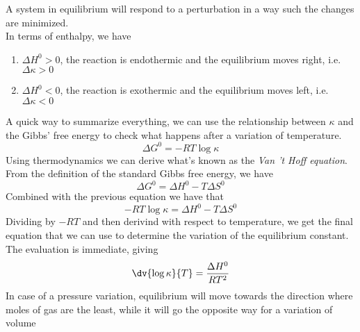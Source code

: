 \documentclass[../qm.tex]{subfiles}
\begin{document}
\begin{thm}[Le Chatelier]
	A system in equilibrium will respond to a perturbation in a way such the changes are minimized.\\
	In terms of enthalpy, we have 
	\begin{enumerate}
	\item $\Delta H^0>0$, the reaction is endothermic and the equilibrium moves right, i.e. $\Delta\kappa>0$
	\item $\Delta H^0<0$, the reaction is exothermic and the equilibrium moves left, i.e. $\Delta\kappa<0$
	\end{enumerate}
	A quick way to summarize everything, we can use the relationship between $\kappa$ and the Gibbs' free energy to check what happens after a variation of temperature.
	\begin{equation}
		\Delta G^0=-RT\log\kappa
		\label{eq:chatelier.chem}
	\end{equation}
    Using thermodynamics we can derive what's known as the \emph{Van 't Hoff equation}.
From the definition of the standard Gibbs free energy, we have
\begin{equation}
        \Delta G^0=\Delta H^0-T\Delta S^0
\end{equation}
    Combined with the previous equation we have that 
    \begin{equation}
        -RT\log{\kappa}=\Delta H^0-T\Delta S^0
    \end{equation}
    Dividing by $-RT$ and then derivind with respect to temperature, we get the final equation that we can use to determine the variation of the equilibrium constant.
The evaluation is immediate, giving
    \begin{equation}
         \dv{\log\kappa}{T}=\frac{\Delta H^0}{RT^2}
    \end{equation} 
	In case of a pressure variation, equilibrium will move towards the direction where moles of gas are the least, while it will go the opposite way for a variation of volume
\end{thm}
\end{document}
